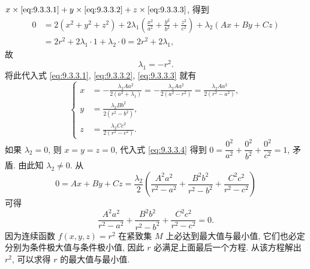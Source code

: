 \begin{solution}
\begin{figure}[htbp]
  \caption{}
  \label{fig:9.3.1}
\end{figure}

$x \times \eqref{eq:9.3.3.1} + y \times \eqref{eq:9.3.3.2} + z \times \eqref{eq:9.3.3.3}$, 得到
\begin{align*}
  0 &= 2(x^{2} + y^{2} + z^{2}) + 2\lambda_{1}\left(\frac{x^{2}}{a^{2}} + \frac{y^{2}}{b^{2}} + \frac{z^{2}}{c^{2}}\right) + \lambda_{2}(Ax + By + Cz) \\
  &= 2r^{2} + 2\lambda_{1} \cdot 1 + \lambda_{2} \cdot 0 = 2r^{2} + 2\lambda_{1},
\end{align*}
故
\[
  \lambda_{1} = -r^{2}.
\]
将此代入式 \eqref{eq:9.3.3.1}, \eqref{eq:9.3.3.2}, \eqref{eq:9.3.3.3} 就有
\[
  \left\{\begin{aligned}
    x &= -\frac{\lambda_{2}Aa^{2}}{2(a^{2} + \lambda_{1})} = -\frac{\lambda_{2}Aa^{2}}{2(a^{2} - r^{2})} = \frac{\lambda_{2}Aa^{2}}{2(r^{2} - a^{2})}, \\
    y &= \frac{\lambda_{2}Bb^{2}}{2(r^{2} - b^{2})}, \\
    z &= \frac{\lambda_{2}Cc^{2}}{2(r^{2} - c^{2})}.
  \end{aligned}\right.
\]
如果 $\lambda_{2} = 0$, 则 $x = y = z = 0$, 代入式 \eqref{eq:9.3.3.4} 得到 $0 = \dfrac{0^{2}}{a^{2}} + \dfrac{0^{2}}{b^{2}} + \dfrac{0^{2}}{c^{2}} = 1$, 矛盾. 由此知 $\lambda_{2} \neq 0$. 从
\[
  0 = Ax + By + Cz = \frac{\lambda_{2}}{2}\left(\frac{A^{2}a^{2}}{r^{2} - a^{2}} + \frac{B^{2}b^{2}}{r^{2} - b^{2}} + \frac{C^{2}c^{2}}{r^{2} - c^{2}}\right)
\]
可得
\[
  \frac{A^{2}a^{2}}{r^{2} - a^{2}} + \frac{B^{2}b^{2}}{r^{2} - b^{2}} + \frac{C^{2}c^{2}}{r^{2} - c^{2}} = 0.
\]
因为连续函数 $f(x, y, z) = r^{2}$ 在紧致集 $M$ 上必达到最大值与最小值, 它们也必定分别为条件极大值与条件极小值, 因此 $r$ 必满足上面最后一个方程. 从该方程解出 $r^{2}$, 可以求得 $r$ 的最大值与最小值.


\end{solution}
